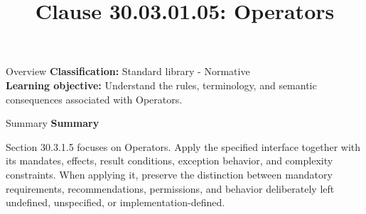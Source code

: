 \documentclass[10pt,letterpaper]{article}
\title{Clause 30.03.01.05: Operators}
\author{}
\date{}
\begin{document}
\maketitle
\begin{CornellOverviewBox}{Overview}
\textbf{Classification:} Standard library - Normative\\[2pt]
\textbf{Learning objective:} Understand the rules, terminology, and semantic consequences associated with Operators.
\end{CornellOverviewBox}\begin{CornellSummaryBox}{Summary}
{\sffamily\bfseries\color{Accent} Summary}\par\vspace{3pt}Section 30.3.1.5 focuses on Operators. Apply the specified interface together with its mandates, effects, result conditions, exception behavior, and complexity constraints. When applying it, preserve the distinction between mandatory requirements, recommendations, permissions, and behavior deliberately left undefined, unspecified, or implementation-defined.
\end{CornellSummaryBox}
\end{document}
